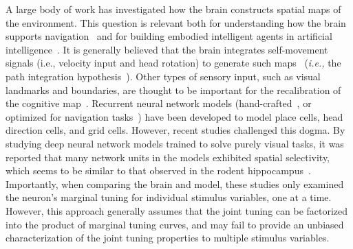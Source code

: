 \documentclass[11pt]{article}
\begin{document}



A large body of work has investigated how the brain constructs spatial maps of the environment. This question is relevant both for understanding how the brain supports navigation~\cite{Mcnaughton2006} and for building embodied intelligent agents in artificial intelligence~\cite{Cadena2017}.  
It is generally believed that the brain integrates self-movement signals (i.e., velocity input and head rotation) to generate such maps~\cite{Mcnaughton2006path} (\textit{i.e.,} the path integration hypothesis~\cite{Darwin1873}). Other types of sensory input, such as visual landmarks and boundaries, are thought to be important for the recalibration of the cognitive map~\cite{Hardcastle2015environmental,Zhang1996}. Recurrent neural network models (hand-crafted~\cite{Samsonovich1997,Zhang1996,Burak2009}, or optimized for navigation tasks~\cite{Cueva2018,Banino2018,Sorscher2020,Cueva2020,Gao2021}) have been developed to model place cells, head direction cells, and  grid cells. %
However, recent studies challenged this dogma. By studying deep neural network models trained to solve purely visual tasks, it was reported that many network units in the models exhibited spatial selectivity, which seems to be similar to that observed in the rodent hippocampus~\cite{Gornet2024automated,Luo2024}. %
Importantly, when comparing the brain and model, these studies only examined the neuron's marginal tuning  for individual stimulus variables, one at a time. However, this approach generally assumes that the joint tuning can be factorized into the product of marginal tuning curves, and may fail to provide an unbiased characterization of the joint tuning properties to multiple stimulus variables. 
\end{document}
